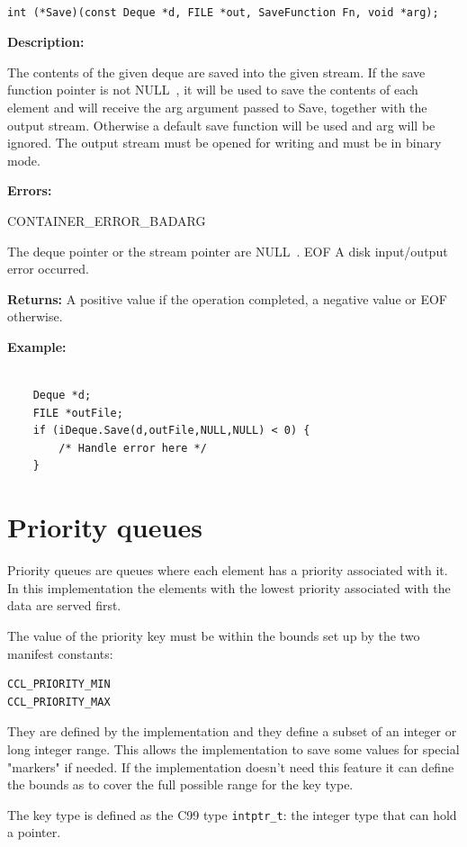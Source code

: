 \documentclass[12pt,a4paper]{memoir} %
\newif\iftth
\newcommand{\api}[1] {%
 \iftth\else\Needspace{3\baselineskip}\fi%
\par\vspace{0.4cm}
\addcontentsline{toc}{subsubsection}{#1}
\index{#1!\container}
\addtocounter{apis}{1}
\noindent {\large \textbf{#1}} \hrulefill%
\iftth\else
\nopagebreak
\fi
\begin{verbatim}
}
\newcommand{\container}{}
\newcommand{\apidescription}{%
\par \noindent \textbf{Description:} %\par\noindent
}
\newcommand{\apierrors}{%
\par \noindent \textbf{Errors:}\par\noindent
}
\newcommand{\doerror}[1]{%
\par\noindent
\iftth
{CONTAINER\_ERROR\_#1}
\else
{\footnotesize CONTAINER\_ERROR\_#1}
\fi
}
\newcommand{\Null}{{\iftth \ NULL \else \footnotesize NULL\  \fi}}
\newcommand{\returns}{\par\noindent\textbf{Returns:}}
\newcommand{\example}{
\par\noindent
\textbf{Example:}
\begin{verbatim}
}
\newcounter{apis}
\begin{document}
{{%---------------------------------------------------------------------------------------------------------------------------------------
\api{Save}
int (*Save)(const Deque *d, FILE *out, SaveFunction Fn, void *arg);
\end{verbatim}
\apidescription
The contents of the given deque are saved into the given stream. If the save function pointer is not \Null, it will be used to save the contents of each element and will receive the arg argument passed to Save, together with the output stream. Otherwise a default save function will be used and arg will be ignored.
The output stream must be opened for writing and must be in binary mode.
\apierrors
\doerror{BADARG} The deque pointer or the stream pointer are \Null.
EOF A disk input/output error occurred.
\returns
A positive value if the operation completed, a negative value or EOF otherwise.
\example
    Deque *d;
    FILE *outFile;
    if (iDeque.Save(d,outFile,NULL,NULL) < 0) { 
        /* Handle error here */
    }
\end{verbatim}
\newpage
\section{Priority queues}
\renewcommand{\container}{PriorityQueues}
Priority queues are queues where each element has a priority associated with it. In this implementation the elements with the lowest priority
associated with the data are served first.

The value of the priority key must be within the bounds set up by the two manifest constants:
\begin{verbatim}
CCL_PRIORITY_MIN
CCL_PRIORITY_MAX
\end{verbatim}

They are defined by the implementation and they define a subset of an integer or long integer range. This allows the implementation to save some
values for special "markers" if needed. If the implementation doesn't need this feature it can define the bounds as to cover the full
possible range for the key type.

The key type is defined as the C99 type \verb,intptr_t,: the integer type that can hold a pointer.

}}
\end{document}
